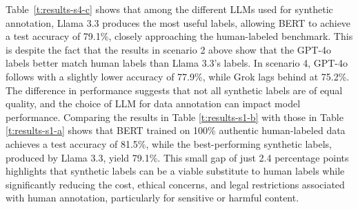 
Table~\ref{t:results-s4-c} shows that among the different LLMs used for synthetic annotation, Llama 3.3 produces the most useful labels, allowing BERT to achieve a test accuracy of 79.1\%, closely approaching the human-labeled benchmark.
This is despite the fact that the results in scenario 2 above show that the GPT-4o labels better match human labels than Llama 3.3's labels.
In scenario 4,
GPT-4o follows with a slightly lower accuracy of 77.9\%, while Grok lags behind at 75.2\%. The difference in performance suggests that not all synthetic labels are of equal quality, and the choice of LLM for data annotation can impact model performance. Comparing the results in Table \ref{t:results-s1-b} with those in Table \ref{t:results-s1-a} shows that BERT trained on 100\% authentic human-labeled data achieves a test accuracy of 81.5\%, while the best-performing synthetic labels, produced by Llama 3.3, yield 79.1\%. This small gap of just 2.4 percentage points highlights that synthetic labels can %
be
a viable substitute
to human labels
while significantly reducing the cost, ethical concerns, and legal restrictions associated with human annotation, particularly for sensitive or harmful content.


  
% 




